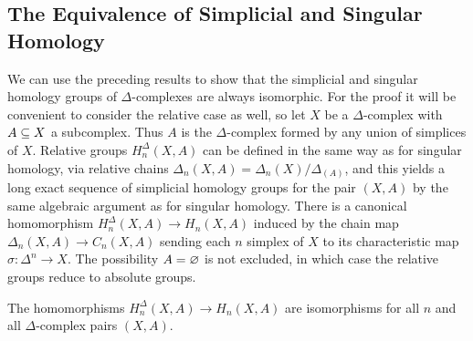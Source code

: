\subsection{The Equivalence of Simplicial and Singular Homology}
We can use the preceding results to show that the simplicial and singular homology groups of $\Delta$-complexes are always isomorphic. For the proof it will be convenient to consider the relative case as well, so let $X$ be a $\Delta$-complex with $A\subseteq X$ a subcomplex. Thus $A$ is the $\Delta$-complex formed by any union of simplices of $X$. Relative groups $H^{\Delta}_n(X,A)$ can be defined in the same way as for singular homology, via relative chains $\Delta_n(X,A)=\Delta_n(X)/\Delta_(A)$, and this yields a long exact sequence of simplicial homology groups for the pair $(X,A)$ by the same algebraic argument as for singular homology. There is a canonical homomorphism $H^\Delta_n(X,A)\to H_n(X,A)$ induced by the chain map $\Delta_n(X,A)\to C_n(X,A)$ sending each $n$ simplex of $X$ to its characteristic map $\sigma:\Delta^n\to X$. The possibility $A=\varnothing$ is not excluded, in which case the relative groups reduce to absolute groups.
\begin{theorem}
The homomorphisms $H^\Delta_n(X,A)\to H_n(X,A)$ are isomorphisms for all $n$ and all $\Delta$-complex pairs $(X,A)$.
\end{theorem}
